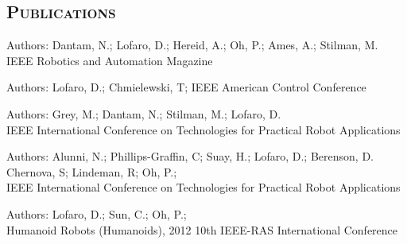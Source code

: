 \begin{resume}
\section{\textsc{Publications}}

\let\thefootnote\relax{}
\begin{position}
Authors: Dantam, N.; Lofaro, D.; Hereid, A.; Oh, P.; Ames, A.; Stilman, M.\\
IEEE Robotics and Automation Magazine
\end{position}

\begin{position}
Authors: Lofaro, D.; Chmielewski, T; 
IEEE American Control Conference 
\end{position}

\begin{position}
Authors: Grey, M.; Dantam, N.; Stilman, M.; Lofaro, D.\\
IEEE International Conference on Technologies for Practical Robot Applications 
\end{position}




\begin{position}
Authors: Alunni, N.; Phillips-Graffin, C; Suay, H.; Lofaro, D.; Berenson, D.\\
Chernova, S; Lindeman, R; Oh, P.;\\
IEEE International Conference on Technologies for Practical Robot Applications 
\end{position}




\begin{position}
Authors: Lofaro, D.; Sun, C.; Oh, P.;\\
Humanoid Robots (Humanoids), 2012 10th IEEE-RAS International Conference 
\end{position}





\end{resume}
